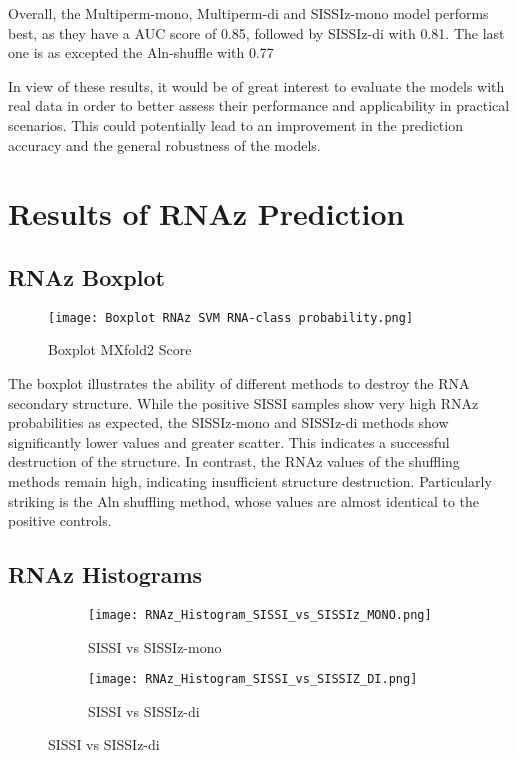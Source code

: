 \documentclass{article}
\begin{document}
\begin{large}
\begin{large}
\begin{large}
Overall, the Multiperm-mono, Multiperm-di and SISSIz-mono model performs best, as they have a AUC score of 0.85, followed by SISSIz-di with 0.81. The last one is as excepted the Aln-shuffle with 0.77 \vspace{1em}

In view of these results, it would be of great interest to evaluate the models with real data in order to better assess their performance and applicability in practical scenarios. This could potentially lead to an improvement in the prediction accuracy and the general robustness of the models.

\clearpage

\section{Results of RNAz Prediction}

\subsection{RNAz Boxplot}

\begin{figure}[H]
    \centering
    \texttt{[image: Boxplot RNAz SVM RNA-class probability.png]}
    \caption{Boxplot MXfold2 Score}
\end{figure}

The boxplot illustrates the ability of different methods to destroy the RNA secondary structure. While the positive SISSI samples show very high RNAz probabilities as expected, the SISSIz-mono and SISSIz-di methods show significantly lower values and greater scatter. This indicates a successful destruction of the structure. In contrast, the RNAz values of the shuffling methods remain high, indicating insufficient structure destruction. Particularly striking is the Aln shuffling method, whose values are almost identical to the positive controls.

\subsection{RNAz Histograms}

\begin{figure}[H]
    \centering
    \begin{subfigure}[b]{0.48\textwidth}
        \texttt{[image: RNAz\_Histogram\_SISSI\_vs\_SISSIz\_MONO.png]}
        \caption{SISSI vs SISSIz-mono}
    \end{subfigure}
    \hfill
    \begin{subfigure}[b]{0.48\textwidth}
        \texttt{[image: RNAz\_Histogram\_SISSI\_vs\_SISSIZ\_DI.png]}
        \caption{SISSI vs SISSIz-di}
    \end{subfigure}
    \vspace{1em}
    

\end{figure}
\end{large}
\end{large}
\end{large}
\end{document}
